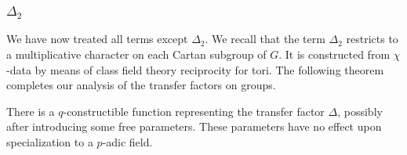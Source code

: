 \subsubsection{$\Delta_2$}

We have now treated all terms except $\Delta_2$.
We recall that the term $\Delta_2$ restricts to a multiplicative character on each Cartan subgroup of $G$.  It is constructed from $\chi$-data by
means of class field theory reciprocity for tori.  The following theorem completes our analysis of the transfer factors on groups.

\begin{theorem}\label{thm:delta2}  There is a $q$-constructible function representing the transfer factor $\Delta$, 
possibly after introducing some free parameters.  These parameters  have no effect upon specialization to a $p$-adic field.
\end{theorem}






